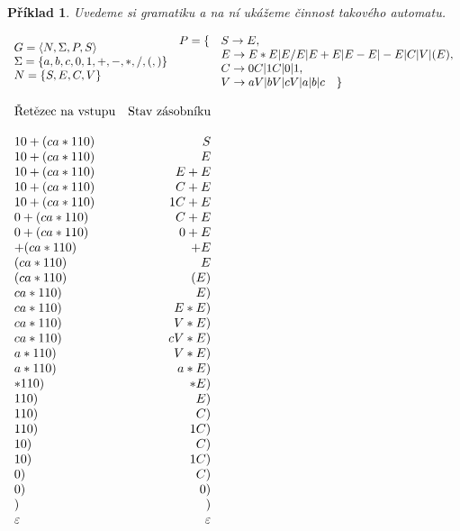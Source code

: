 \documentclass[10pt, a4paper, titlepage]{article}
\theoremstyle{note}
\newtheorem{priklad}{\textbf{Příklad}}
\begin{document}
\begin{priklad}
Uvedeme si gramatiku a na ní ukážeme činnost takového automatu.

$\begin{array}{l}
G=\langle N,\Sigma,P,S \rangle \\
\Sigma = \lbrace a,b,c,0,1,+,-,*,/,(,) \rbrace \\
N = \lbrace S,E,C,V \rbrace \\
\end{array}\\
\begin{array}{l l}
P= \lbrace &S \rightarrow E, \\
& E \rightarrow E*E|E/E|E+E|E-E|-E|C|V|(E), \\
& C \rightarrow 0C|1C|0|1, \\
& V \rightarrow aV|bV|cV|a|b|c \quad \rbrace
\end{array}
$
\begin{center}
$
\begin{array}{l r}
\text{Řetězec na vstupu} & \text{Stav zásobníku} \\
\\
10+(ca*110) & S \\
10+(ca*110) & E \\
10+(ca*110) & E+E \\
10+(ca*110) & C+E \\
10+(ca*110) & 1C+E \\
0+(ca*110) & C+E \\
0+(ca*110) & 0+E \\
+(ca*110) & +E \\
(ca*110) & E \\
(ca*110) & (E) \\
ca*110) & E) \\
ca*110) & E*E) \\
ca*110) & V*E) \\
ca*110) & cV*E) \\
a*110) & V*E) \\
a*110) & a*E) \\
*110) & *E) \\
110) & E) \\
110) & C) \\
110) & 1C) \\
10) & C) \\
10) & 1C) \\
0) & C) \\
0) & 0) \\
) & ) \\
\varepsilon & \varepsilon \\
\end{array}
$
\end{center}
\end{priklad}
\end{document}

